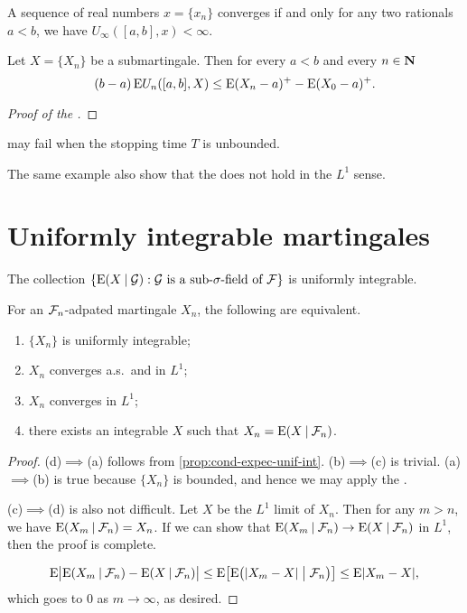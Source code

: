 \begin{lem}
    A sequence of real numbers $x = \{x_n\}$ converges if and only for any two rationals $a < b$, we have $U_\infty([a,b],x) < \infty$.
\end{lem}

\begin{namedthm}
    Let $X = \{X_n\}$ be a submartingale. Then for every $a < b$ and every $n \in \mathbf{N}$
    \[
        (b - a)\mathop{}\!\mathrm{E} U_n([a,b],X) \leq \mathop{}\!\mathrm{E}(X_n - a)^+ - \mathop{}\!\mathrm{E}(X_0 - a)^+.
    \]
\end{namedthm}

\begin{proof}[Proof of the ]
    
\end{proof}

 may fail when the stopping time $T$ is unbounded.

The same example also show that the  does not hold in the $L^1$ sense.

\section{Uniformly integrable martingales}

\begin{prop} \label{prop:cond-expec-unif-int}
    The collection $\{\mathop{}\!\mathrm{E}(X \mathbin{|} \mathcal{G}) : \mathcal{G} \text{ is a sub-$\sigma$-field of }\mathcal{F}\}$ is uniformly integrable.
\end{prop}

\begin{thm}
    For an $\mathcal{F}_n$-adpated martingale $X_n$, the following are equivalent. 
    \begin{enumerate}
        \item $\{X_n\}$ is uniformly integrable;
        \item $X_n$ converges a.s.\ and in $L^1$;
        \item $X_n$ converges in $L^1$;
        \item there exists an integrable $X$ such that $X_n = \mathop{}\!\mathrm{E}(X \mathbin{|} \mathcal{F}_n)$.
    \end{enumerate}
\end{thm}
\begin{proof}
    (d)$\implies$(a) follows from \cref{prop:cond-expec-unif-int}. (b)$\implies$(c) is trivial. (a)$\implies$(b) is true because $\{X_n\}$ is bounded, and hence we may apply the .

    (c)$\implies$(d) is also not difficult. Let $X$ be the $L^1$ limit of $X_n$. Then for any $m > n$, we have $\mathop{}\!\mathrm{E}(X_m \mathbin{|} \mathcal{F}_n) = X_n$. If we can show that $\mathop{}\!\mathrm{E}(X_m \mathbin{|} \mathcal{F}_n) \to \mathop{}\!\mathrm{E}(X\mathbin{|} \mathcal{F}_n)$ in $L^1$, then the proof is complete.

    \[
        \mathop{}\!\mathrm{E}\bigl\vert\mathop{}\!\mathrm{E}(X_m \mathbin{|} \mathcal{F}_n) - \mathop{}\!\mathrm{E}(X\mathbin{|} \mathcal{F}_n)\bigr\rvert \leq \mathop{}\!\mathrm{E}\bigl[ \mathop{}\!\mathrm{E}\bigl(\lvert X_m - X \rvert \bigm\vert \mathcal{F}_n\bigr) \bigr]\leq\mathop{}\!\mathrm{E}\lvert X_m - X \rvert,
    \] which goes to $0$ as $m \to \infty$, as desired.
\end{proof}

